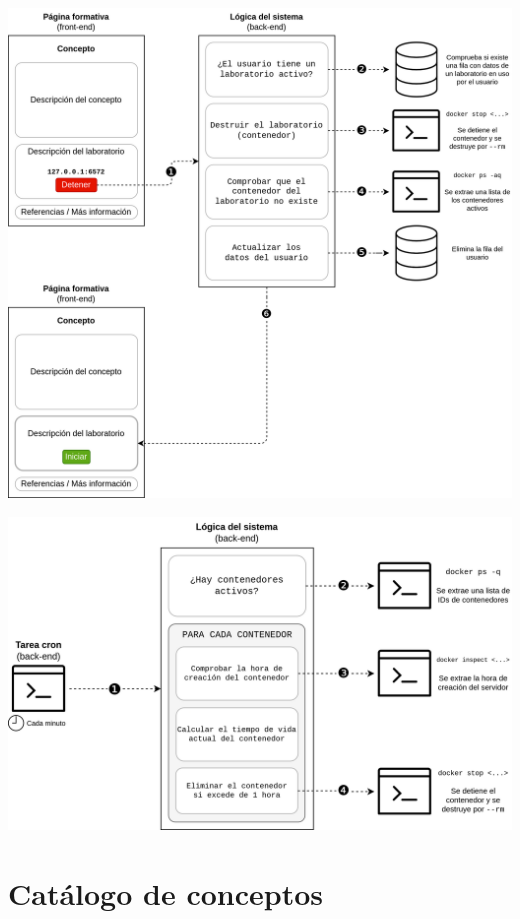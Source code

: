     \begin{frame}
        \centering

        \includegraphics[scale=0.09]{images/diagramas/detener.png}
    \end{frame}

    \begin{frame}
        \centering

        \includegraphics[scale=0.15]{images/diagramas/cron.png}
    \end{frame}


\section{Catálogo de conceptos}

